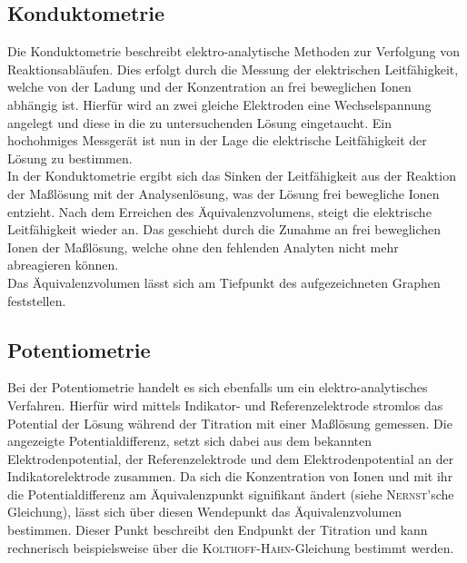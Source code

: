 \subsection*{Konduktometrie}
Die Konduktometrie beschreibt elektro-analytische Methoden zur Verfolgung von Reaktionsabläufen. Dies erfolgt durch die Messung der elektrischen Leitfähigkeit, welche von der Ladung und der Konzentration an frei beweglichen Ionen abhängig ist. Hierfür wird an zwei gleiche Elektroden eine Wechselspannung angelegt und diese in die zu untersuchenden Lösung eingetaucht. Ein hochohmiges Messgerät ist nun in der Lage die elektrische Leitfähigkeit der Lösung zu bestimmen.\\
In der Konduktometrie ergibt sich das Sinken der Leitfähigkeit aus der Reaktion der Maßlösung mit der Analysenlösung, was der Lösung frei bewegliche Ionen entzieht. Nach dem Erreichen des Äquivalenzvolumens, steigt die elektrische Leitfähigkeit wieder an. Das geschieht durch die Zunahme an frei beweglichen Ionen der Maßlösung, welche ohne den fehlenden Analyten nicht mehr abreagieren können.\cite{Holze.2012}\\
Das Äquivalenzvolumen lässt sich am Tiefpunkt des aufgezeichneten Graphen feststellen.

\subsection*{Potentiometrie}
Bei der Potentiometrie handelt es sich ebenfalls um ein elektro-analytisches Verfahren. Hierfür wird mittels Indikator- und Referenzelektrode stromlos das Potential der Lösung während der Titration mit einer Maßlösung gemessen. Die angezeigte Potentialdifferenz,  setzt sich dabei aus dem bekannten Elektrodenpotential, der Referenzelektrode und dem Elektrodenpotential an der Indikatorelektrode zusammen. Da sich die Konzentration von Ionen und mit ihr die Potentialdifferenz am Äquivalenzpunkt signifikant ändert (siehe \textsc{Nernst}'sche Gleichung), lässt sich über diesen Wendepunkt das Äquivalenzvolumen bestimmen. Dieser Punkt beschreibt den Endpunkt der Titration und kann rechnerisch beispielsweise über die \textsc{Kolthoff-Hahn}-Gleichung bestimmt werden.\cite{Brehm.2007}

